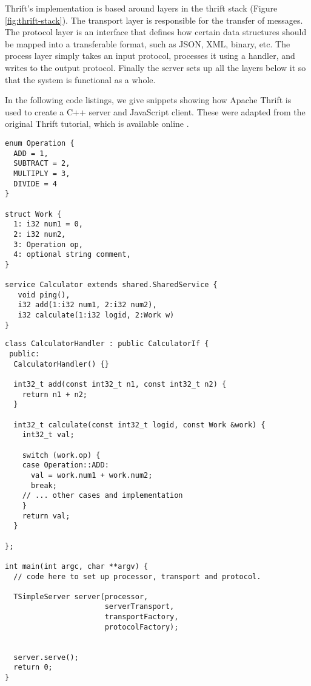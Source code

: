 Thrift's implementation is based around layers in the thrift stack (Figure \ref{fig:thrift-stack}). The transport layer is responsible for the transfer of messages. The protocol layer is an interface that defines how certain data structures should be mapped into a transferable format, such as JSON, XML, binary, etc. The process layer simply takes an input protocol, processes it using a handler, and writes to the output protocol. Finally the server sets up all the layers below it so that the system is functional as a whole.

In the following code listings, we give snippets showing how Apache Thrift is used to create a C++ server and JavaScript client. These were adapted from the original Thrift tutorial, which is available online \cite{apachethrift}.

\begin{lstlisting}
enum Operation {
  ADD = 1,
  SUBTRACT = 2,
  MULTIPLY = 3,
  DIVIDE = 4
}

struct Work {
  1: i32 num1 = 0,
  2: i32 num2,
  3: Operation op,
  4: optional string comment,
}

service Calculator extends shared.SharedService {
   void ping(),
   i32 add(1:i32 num1, 2:i32 num2),
   i32 calculate(1:i32 logid, 2:Work w)
}
\end{lstlisting}

\begin{lstlisting}
class CalculatorHandler : public CalculatorIf {
 public:
  CalculatorHandler() {}

  int32_t add(const int32_t n1, const int32_t n2) {
    return n1 + n2;
  }

  int32_t calculate(const int32_t logid, const Work &work) {
    int32_t val;

    switch (work.op) {
    case Operation::ADD:
      val = work.num1 + work.num2;
      break;
    // ... other cases and implementation
    }
    return val;
  }

};

int main(int argc, char **argv) {
  // code here to set up processor, transport and protocol.

  TSimpleServer server(processor,
                       serverTransport,
                       transportFactory,
                       protocolFactory);


  server.serve();
  return 0;
}
\end{lstlisting}


